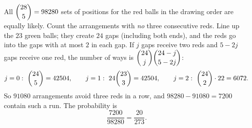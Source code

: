 All $\dbinom{28}{5}=98280$ sets of positions for the red balls in the drawing order are equally likely. Count the arrangements with \emph{no} three consecutive reds. Line up the $23$ green balls; they create $24$ gaps (including both ends), and the reds go into the gaps with at most $2$ in each gap. If $j$ gaps receive two reds and $5-2j$ gaps receive one red, the number of ways is $\dbinom{24}{j}\dbinom{24-j}{5-2j}$:
\[
j=0:\ \dbinom{24}{5}=42504,\qquad j=1:\ 24\dbinom{23}{3}=42504,\qquad j=2:\ \dbinom{24}{2}\cdot22=6072 .
\]
So $91080$ arrangements avoid three reds in a row, and $98280-91080=7200$ contain such a run. The probability is
\[
\dfrac{7200}{98280}=\boxed{\dfrac{20}{273}}.
\]
